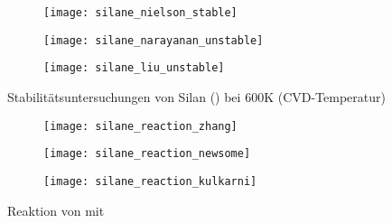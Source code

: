 \begin{figure}[h!]

  \captionsetup[subfigure]{singlelinecheck=false}
  \def\subfigwidth{0.32\textwidth}
  \begin{subfigure}[t]{3.5cm}
    \texttt{[image: silane\_nielson\_stable]}
  \end{subfigure}
  \hfill
  \begin{subfigure}[t]{4.5cm}
    \texttt{[image: silane\_narayanan\_unstable]}
  \end{subfigure}
  \hfill
  \begin{subfigure}[t]{5cm}
    \texttt{[image: silane\_liu\_unstable]}
  \end{subfigure}

  \caption[Stabilitätsuntersuchungen von Silan]{
    Stabilitätsuntersuchungen von Silan () bei 600K (CVD-Temperatur)
  }
  \label{fig:silanestability}

\end{figure}

\begin{figure}[h!]

  \captionsetup[subfigure]{singlelinecheck=false}
  \def\subfigwidth{0.32\textwidth}
  \begin{subfigure}[t]{3cm}
    \texttt{[image: silane\_reaction\_zhang]}
  \end{subfigure}
  \hfill
  \begin{subfigure}[t]{5cm}
    \texttt{[image: silane\_reaction\_newsome]}
  \end{subfigure}
  \hfill
  \begin{subfigure}[t]{4.5cm}
    \texttt{[image: silane\_reaction\_kulkarni]}
  \end{subfigure}

  \caption[Reaktionen von  mit ]{
    Reaktion von  mit 
  }
  \label{fig:precursorreactions}

\end{figure}

